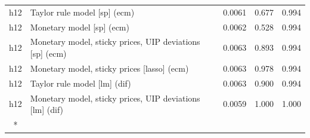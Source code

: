 \begin{ThreePartTable}
\begin{longtable}[t]{cp{5.5cm}ccc}
h12 & \raggedright Taylor rule model [sp] (ecm) & 0.0061 & 0.677 & 0.994\\
h12 & \raggedright Monetary model [sp] (ecm) & 0.0062 & 0.528 & 0.994\\
h12 & \raggedright Monetary model, sticky prices, UIP deviations [sp] (ecm) & 0.0063 & 0.893 & 0.994\\
h12 & \raggedright Monetary model, sticky prices [lasso] (ecm) & 0.0063 & 0.978 & 0.994\\
h12 & \raggedright Taylor rule model [lm] (dif) & 0.0063 & 0.900 & 0.994\\
h12 & \raggedright Monetary model, sticky prices, UIP deviations [lm] (dif) & 0.0059 & 1.000 & 1.000\\*
\end{longtable}
\end{ThreePartTable}
\endgroup{}
